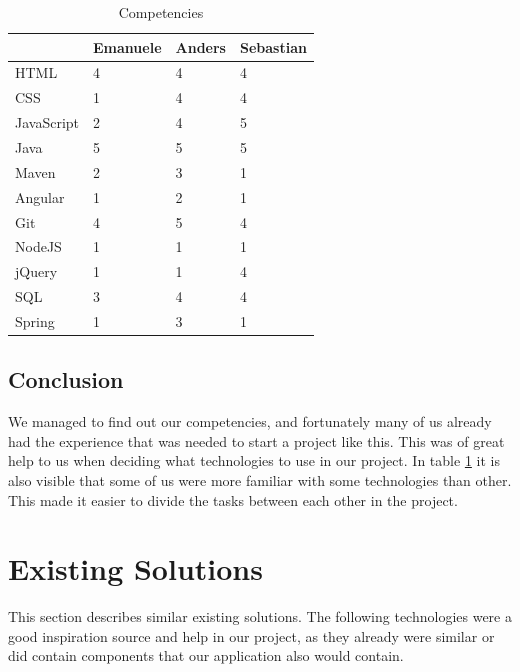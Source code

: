 \begin{table}
\begin{center}
\begin{tabular}{ l | l | l | l }
  \hline
  & Emanuele & Anders & Sebastian \\ \hline
  HTML & 4 & 4 & 4 \\
  CSS  & 1 & 4 & 4 \\
  JavaScript & 2 & 4 & 5 \\
  Java & 5 & 5 & 5 \\
  Maven & 2 & 3 & 1 \\
  Angular & 1 & 2 & 1 \\
  Git & 4 & 5 & 4 \\
  NodeJS & 1 & 1 & 1 \\
  jQuery & 1 & 1 & 4 \\
  SQL & 3 & 4 & 4 \\
  Spring & 1 & 3 & 1 \\
  \hline
\end{tabular}
\end{center}
\caption{Competencies}
\label{table:competencies}
\end{table}

\subsection{Conclusion}

We managed to find out our competencies, and fortunately many of us already had the experience that was needed to start a project like this.
This was of great help to us when deciding what technologies to use in our project.
In table \ref{table:competencies} it is also visible that some of us were more familiar with some technologies than other.
This made it easier to divide the tasks between each other in the project.


\section{Existing Solutions}
\label{section:existing-solutions}

This section describes similar existing solutions.
The following technologies were a good inspiration source and help in our project,
as they already were similar or did contain components that our application also would contain.

